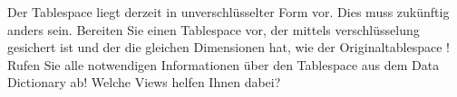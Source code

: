     \item Der Tablespace  liegt derzeit in unverschl\"usselter Form vor. Dies muss zuk\"unftig anders sein. Bereiten Sie einen Tablespace  vor, der mittels  verschl\"usselung gesichert ist und der die gleichen Dimensionen hat, wie der Originaltablespace ! Rufen Sie alle notwendigen Informationen \"uber den Tablespace  aus dem Data Dictionary ab! Welche Views helfen Ihnen dabei?
